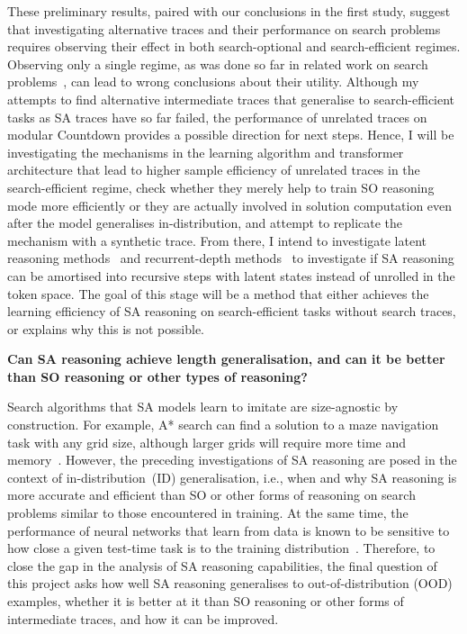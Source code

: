 These preliminary results, paired with our conclusions in the first study, suggest that investigating alternative traces and their performance on search problems requires observing their effect in both search-optional and search-efficient regimes.
Observing only a single regime, as was done so far in related work on search problems~\citep{suDualformerControllableFast2025,valmeekamSemanticsUnreasonableEffectiveness2025}, can lead to wrong conclusions about their utility.
Although my attempts to find alternative intermediate traces that generalise to search-efficient tasks as SA traces have so far failed, the performance of unrelated traces on modular Countdown provides a possible direction for next steps.
Hence, I will be investigating the mechanisms in the learning algorithm and transformer architecture that lead to higher sample efficiency of unrelated traces in the search-efficient regime, check whether they merely help to train SO reasoning mode more efficiently or they are actually involved in solution computation even after the model generalises in-distribution, and attempt to replicate the mechanism with a synthetic trace.
From there, I intend to investigate latent reasoning methods~\citep{haoTrainingLargeLanguage2025,zhuReasoningSuperpositionTheoretical2025} and recurrent-depth methods~\citep{saunshiLoopedTransformers2025,geipingRecurrentDepth2025} to investigate if SA reasoning can be amortised into recursive steps with latent states instead of unrolled in the token space.
The goal of this stage will be a method that either achieves the learning efficiency of SA reasoning on search-efficient tasks without search traces, or explains why this is not possible.

\bigskip

\textbf{Can SA reasoning achieve length generalisation, and can it be better than SO reasoning or other types of reasoning?}

\bigskip

Search algorithms that SA models learn to imitate are size-agnostic by construction.
For example, A* search can find a solution to a maze navigation task with any grid size, although larger grids will require more time and memory~\citep{russel2010}.
However, the preceding investigations of SA reasoning are posed in the context of in-distribution~(ID) generalisation, i.e., when and why SA reasoning is more accurate and efficient than SO or other forms of reasoning on search problems similar to those encountered in training.
At the same time, the performance of neural networks that learn from data is known to be sensitive to how close a given test-time task is to the training distribution~\citep{geirhosShortcutLearning2020}.
Therefore, to close the gap in the analysis of SA reasoning capabilities, the final question of this project asks how well SA reasoning generalises to out-of-distribution (OOD) examples, whether it is better at it than SO reasoning or other forms of intermediate traces, and how it can be improved.


